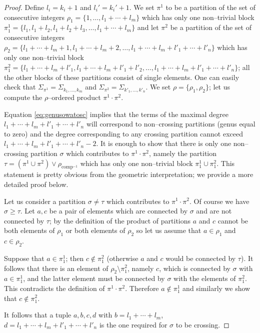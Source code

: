 \documentclass[12pt,dvips]{amsart}
\numberwithin{equation}{section} \numberwithin{figure}{section}
\theoremstyle{plain}
\theoremstyle{definition}
\theoremstyle{remark}
\DeclareMathOperator{\comp}{comp}
\begin{document}
\begin{proof}
Define $l_i=k_i+1$ and $l_i'=k_i'+1$. We set $\pi^1$ to be a
partition of the set of consecutive integers
$\rho_1=\{1,\dots,l_1+\cdots+l_m\}$ which has only one non--trivial
block $\pi^1_1=\{l_1,l_1+l_2,l_1+l_2+l_3,\dots,l_1+\cdots+l_m\}$ and
let $\pi^2$ be a partition of the set of consecutive integers
$\rho_2=\{l_1+\cdots+l_m+1,l_1+\cdots+l_m+2,\dots,l_1+\cdots+l_m+l'_1+\cdots+l'_n\}$
which has only one non--trivial block
$\pi^2_1=\{l_1+\cdots+l_m+l'_1,l_1+\cdots+l_m+l'_1+l'_2,\dots,
l_1+\cdots+l_m+l'_1+\cdots+l'_n\}$; all the other blocks of these
partitions consist of single elements.
One can easily check that $\Sigma_{\pi^1}=\Sigma_{k_1,\dots,k_m}$
and $\Sigma_{\pi^2}= \Sigma_{k'_1,\dots,k'_n}$. We set
$\rho=\{\rho_1,\rho_2\}$; let us compute the $\rho$--ordered product
$\pi^1 \cdot \pi^2$.

Equation \eqref{eq:genusowatosc} implies that the terms of the
maximal degree $l_1+\cdots+l_m+l'_1+\cdots+l'_n$ will correspond to
non--crossing partitions (genus equal to zero) and the degree
corresponding to any crossing partition cannot exceed
$l_1+\cdots+l_m+l'_1+\cdots+l'_n-2$. It is enough to show that there
is only one non--crossing partition $\sigma$ which contributes to
$\pi^1 \cdot \pi^2$, namely  the partition $\tau=(\pi^1 \cup \pi^2)
\vee \rho_{\comp^{-1}}$ which has only one non--trivial block
$\pi^1_1\cup\pi^2_1$. This statement is pretty obvious from the
geometric interpretation; we provide a more detailed proof below.

Let us consider a partition $\sigma\neq \tau$ which contributes to
$\pi^1 \cdot \pi^2$. Of course we have $\sigma\geq\tau$. Let $a,c$
be a pair of elements which are connected by $\sigma$ and are not
connected by $\tau$; by the definition of the product of partitions
$a$ and $c$ cannot be both elements of $\rho_1$ or both elements of
$\rho_2$ so let us assume that $a\in\rho_1$ and $c\in\rho_2$.

Suppose that $a\in\pi^1_1$; then $c\notin\pi^2_1$ (otherwise $a$ and
$c$ would be connected by $\tau$). It follows that there is an
element of $\rho_2\setminus\pi^2_1$, namely $c$, which is connected
by $\sigma$ with $a\in\pi_1^1$, and the latter element must be
connected by $\sigma$ with the elements of $\pi^2_1$. This
contradicts the definition of $\pi^1 \cdot \pi^2$. Therefore
$a\notin\pi^1_1$ and similarly we show that $c\notin\pi^2_1$.

It follows that a tuple $a,b,c,d$ with $b=l_1+\cdots+l_m$,
$d=l_1+\cdots+l_m+l'_1+\cdots+l'_n$ is the one required for $\sigma$
to be crossing.


\end{proof}
\end{document}
